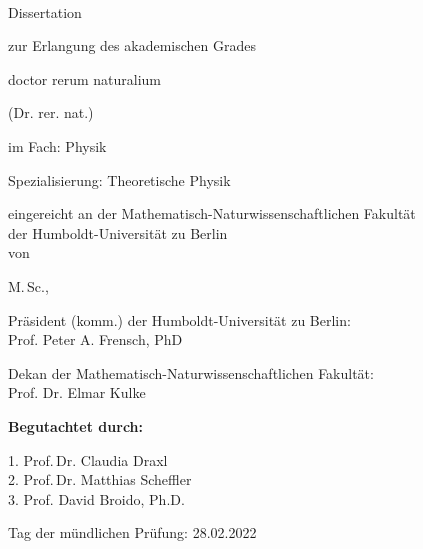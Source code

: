 \makeatletter
\thispagestyle{empty}

\begin{fullwidth}
  \begin{center}
  \LARGE
  \textbf{\@title}
  \\ \vspace{3em}
  
  \Large
  Dissertation 
  
  zur Erlangung des akademischen Grades 
  
  doctor rerum naturalium
  
  (Dr. rer. nat.)
  
  \vspace{3em}
    
  im Fach: Physik

Spezialisierung: Theoretische Physik 

\vspace{3em}

eingereicht an der Mathematisch-Naturwissenschaftlichen Fakultät \\
der Humboldt-Universität zu Berlin \\
von 

\vspace{3em} 

M.\,Sc., \@author \\

\vspace{3em}

Präsident (komm.) der Humboldt-Universität zu Berlin: \\ Prof. Peter A. Frensch, PhD

\vspace{3em}

Dekan der Mathematisch-Naturwissenschaftlichen Fakultät: \\ Prof. Dr. Elmar Kulke

\vspace{3em}

\vfill
\textbf{Begutachtet durch:}

\vspace{2em}

1. Prof.\,Dr. Claudia Draxl \\ \vspace{1em}
2. Prof.\,Dr. Matthias Scheffler \\ \vspace{1em}
3. Prof. David Broido, Ph.D.


\vspace{2em}

Tag der mündlichen Prüfung: 28.02.2022

\end{center}
\end{fullwidth}
\makeatother